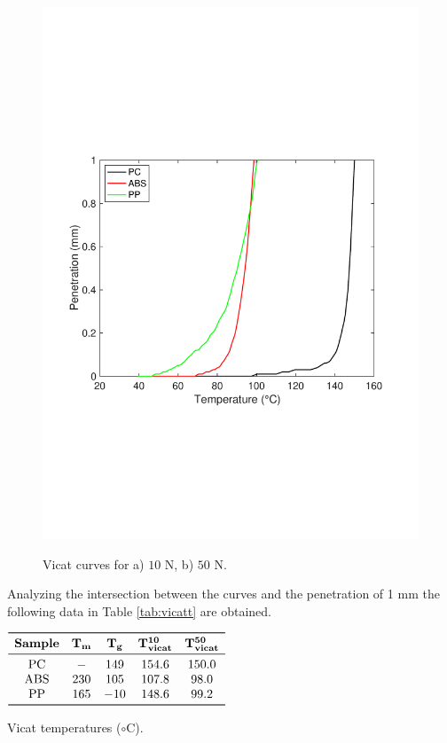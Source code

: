 \documentclass[a4paper, 11pt]{article}
\begin{document}
\begin{figure}[htp]
	{\includegraphics[scale=0.36]{vicat50}}\qquad
	\captionsetup{justification=centering}
	\caption{Vicat curves for a) $10$ N, b) $50$ N.}
	\label{fig:vicat}
\end{figure}

Analyzing the intersection between the curves and the penetration of 1 mm the following data in Table \ref{tab:vicatt} are obtained.

\begin{table}[htp]
	\centering
	$
	\begin{array}{ccccc}
	\toprule
	\textbf{Sample} & \mathbf{T_{m}} & \mathbf{T_{g}} & \mathbf{T_{vicat}^\textbf{10}} & \mathbf{T_{vicat}^\textbf{50}} \\
	\midrule
	\text{PC} & - & 149 & 154.6 & 150.0\\
	\text{ABS} & 230 & 105 & 107.8 & 98.0\\
	\text{PP} & 165 & -10 & 148.6 & 99.2\\
	\bottomrule
	\end{array}
	$
	\caption{Vicat temperatures ($\circ$C).}
	\label{tab:vicatt}
\end{table}
\end{document}

